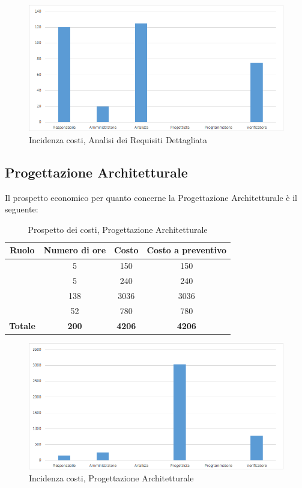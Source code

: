 \begin{figure}[H]
	\centering
	\includegraphics[scale=0.6]{img/8-1a.png}
	\caption{Incidenza costi, Analisi dei Requisiti Dettagliata}
\end{figure}

\newpage
\subsection{Progettazione Architetturale}
Il prospetto economico per quanto concerne la Progettazione Architetturale è il seguente:


\begin{table}[H]
	\begin{center}
		\begin{tabular}{|c|c|c|c|}
			\hline
			\textbf{Ruolo}	& \textbf{Numero di ore} & \textbf{Costo} & \textbf{Costo a preventivo} \\
			\hline
			\Res	&	5  &	150  &	150	\\
			\hline
			\Amm	&	5  &	240  &	240	\\
			\hline
			\Prog	&	138  &	3036  &	3036	\\
			\hline
			\Ver	&	52  &	780  &	780	\\
			\hline
			\textbf{Totale}  &	\textbf{200} &	\textbf{4206} &	\textbf{4206}	\\
			\hline
		\end{tabular}
	\end{center}
	\caption{Prospetto dei costi, Progettazione Architetturale }
\end{table}

\begin{figure}[H]
	\centering
	\includegraphics[scale=0.6]{img/8-2.png}
	\caption{Incidenza costi, Progettazione Architetturale}
\end{figure}

